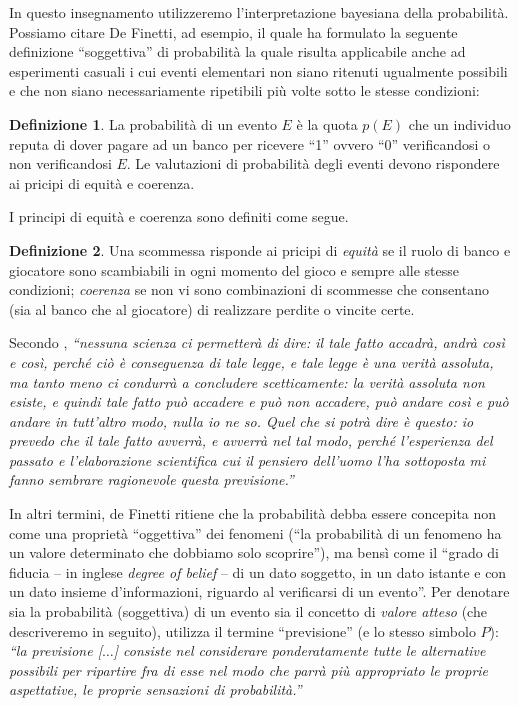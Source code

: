 \documentclass[
  11pt,
]{krantz}
\theoremstyle{definition}
\newtheorem{definition}{Definizione}[chapter]
\theoremstyle{definition}
\theoremstyle{definition}
\theoremstyle{definition}
\theoremstyle{remark}
\begin{document}
In questo insegnamento utilizzeremo l'interpretazione bayesiana della probabilità. Possiamo citare De Finetti, ad esempio, il quale ha formulato la seguente definizione ``soggettiva'' di probabilità la quale risulta applicabile anche ad esperimenti casuali i cui eventi elementari non siano ritenuti ugualmente possibili e che non siano necessariamente ripetibili più volte sotto le stesse condizioni:

\begin{definition}
La probabilità di un evento \(E\) è la quota \(p(E)\) che un individuo reputa di dover pagare ad un banco per ricevere ``1'' ovvero ``0'' verificandosi o non verificandosi \(E\). Le valutazioni di probabilità degli eventi devono rispondere ai pricipi di equità e coerenza.
\end{definition}

I principi di equità e coerenza sono definiti come segue.

\begin{definition}
Una scommessa risponde ai pricipi di \emph{equità} se il ruolo di banco e giocatore sono scambiabili in ogni momento del gioco e sempre alle stesse condizioni; \emph{coerenza} se non vi sono combinazioni di scommesse che consentano (sia al banco che al giocatore) di realizzare perdite o vincite certe.
\end{definition}

Secondo \citet{definetti1931prob}, \emph{``nessuna scienza ci permetterà di dire: il tale fatto accadrà, andrà così e così, perché ciò è conseguenza di tale legge, e tale legge è una verità assoluta, ma tanto meno ci condurrà a concludere scetticamente: la verità assoluta non esiste, e quindi tale fatto può accadere e può non accadere, può andare così e può andare in tutt'altro modo, nulla io ne so. Quel che si potrà dire è questo: io prevedo che il tale fatto avverrà, e avverrà nel tal modo, perché l'esperienza del passato e l'elaborazione scientifica cui il pensiero dell'uomo l'ha sottoposta mi fanno sembrare ragionevole questa previsione.''}

In altri termini, de Finetti ritiene che la probabilità debba essere concepita non come una proprietà ``oggettiva'' dei fenomeni (``la probabilità di un fenomeno ha un valore determinato che dobbiamo solo scoprire''), ma bensì come il ``grado di fiducia -- in inglese \emph{degree of belief} -- di un dato soggetto, in un dato istante e con un dato insieme d'informazioni, riguardo al verificarsi di un evento''. Per denotare sia la probabilità (soggettiva) di un evento sia il concetto di \emph{valore atteso} (che descriveremo in seguito), \citet{definetti1970teoria} utilizza il termine ``previsione'' (e lo stesso simbolo \(P\)): \emph{``la previsione {[}\(\dots\){]} consiste nel considerare ponderatamente tutte le alternative possibili per ripartire fra di esse nel modo che parrà più appropriato le proprie aspettative, le proprie sensazioni di probabilità.''}
\end{document}
